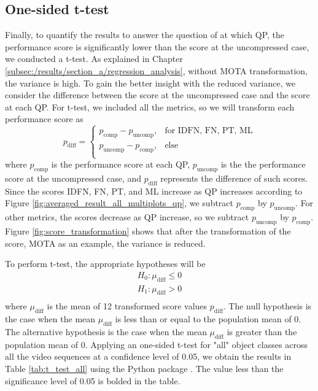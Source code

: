 
\subsection{One-sided t-test}
\label{subsec:/results/section_a/t_test}
Finally, to quantify the results to answer the question of at which QP, the performance score is significantly lower than the score at the uncompressed case, we conducted a t-test. 
As explained in Chapter \ref{subsec:/results/section_a/regression_analysis}, without MOTA transformation, the variance is high. To gain the better insight with the reduced variance, we consider the difference between the score at the uncompressed case and the score at each QP. For t-test, we included all the metrics, so we will transform each performance score as
\begin{equation}
  p_{\text{diff}} =
    \begin{cases}
         p_{\text{comp}} - p_{\text{uncomp}} ,& \text{for IDFN, FN, PT, ML} \\        
         p_{\text{uncomp}} - p_{\text{comp}} ,& \text{else} \\
    \end{cases}
\end{equation}
where $p_{\text{comp}}$ is the performance score at each QP, $p_{\text{uncomp}}$ is the the performance score at the uncompressed case, and $p_{\text{diff}}$ represents the difference of such scores. Since the scores IDFN, FN, PT, and ML increase as QP increases according to Figure \ref{fig:averaged_result_all_multiplots_qp}, we subtract $p_{\text{comp}}$ by $p_{\text{uncomp}}$. For other metrics, the scores decrease as QP increase, so we subtract $p_{\text{uncomp}}$ by $p_{\text{comp}}$. Figure \ref{fig:score_transformation} shows that after the transformation of the score, MOTA as an example, the variance is reduced.

To perform t-test, the appropriate hypotheses will be
\begin{equation}
    \begin{aligned}
        H_0 : \mu_{\text{diff}} \leq 0 \\
        H_1 : \mu_{\text{diff}} > 0 \\
    \end{aligned}
\end{equation}
where $\mu_{\text{diff}}$ is the mean of 12 transformed score values $p_{\text{diff}}$. The null hypothesis is the case when the mean $\mu_{\text{diff}}$ is less than or equal to the population mean of 0. The alternative hypothesis is the case when the mean $\mu_{\text{diff}}$ is greater than the population mean of 0. Applying an one-sided t-test for "all" object classes across all the video sequences at a confidence level of 0.05, we obtain the results in Table \ref{tab:t_test_all} using the Python package \cite{virtanen_scipy_2020}. The value less than the significance level of 0.05 is bolded in the table.
